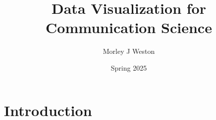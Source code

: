 \documentclass{article}
\title{Data Visualization for Communication Science}
\author{Morley J Weston}
\date{Spring 2025}
\begin{document}
\maketitle

\section{Introduction}
\end{document}
